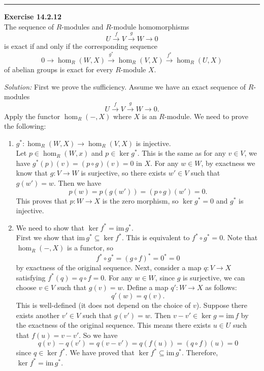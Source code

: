 \documentclass[a4paper, 12pt]{article}
\newenvironment{problem}[2][Exercise]
    { \begin{mdframed}[backgroundcolor=gray!20] \textbf{#1 #2} \\}
    {  \end{mdframed}}
\newenvironment{solution}
    {\textit{Solution:}}
    {}
\newcommand{\im}{\text{im}\,}
\begin{document}
\noindent\rule{7in}{2.8pt}
\newpage 
\begin{problem}{14.2.12}
The sequence of \(R\)-modules and \(R\)-module homomorphisms 
\[U\xrightarrow{f}V\xrightarrow{g}W\rightarrow 0\]
is exact if and only if the corresponding sequence 
\[0\rightarrow \hom_R(W,X)\xrightarrow{g^*}\hom_R(V,X)\xrightarrow{f^*}\hom_R(U,X)\]
of abelian groups is exact for every \(R\)-module \(X\).
\end{problem}
\begin{solution}
First we prove the sufficiency. Assume we have an exact sequence of \(R\)-modules
\[U\xrightarrow{f}V\xrightarrow{g}W\rightarrow 0.\]
Apply the functor \(\hom_R(-,X)\) where \(X\) is an \(R\)-module. We need to prove the following:
\begin{enumerate}[(1)]
\item \(g^*:\hom_R(W,X)\rightarrow \hom_R(V,X)\) is injective.\\ 
Let \(p\in \hom_R(W,x)\) and \(p\in \ker g^*\). This is the same as for any \(v\in V\), we have \(g^*(p)(v)=(p\circ g)(v)=0\) in \(X\). For any \(w\in W\), by exactness we know that 
\(g:V\rightarrow W\) is surjective, so there exists \(w'\in V\) such that \(g(w')=w\). Then we have 
\[p(w)=p(g(w'))=(p\circ g)(w')=0.\]
This proves that \(p:W\rightarrow X\) is the zero morphism, so \(\ker g^*=0\) and \(g^*\) is injective.
\item We need to show that \(\ker f^*=\im g^*\).\\ 
First we show that \(\im g^*\subseteq \ker f^*\). This is equivalent to \(f^*\circ g^*=0\). Note that \(\hom_R(-,X)\) is a functor, so 
\[f^*\circ g^*=(g\circ f)^*=0^*=0\]
by exactness of the original sequence. Next, consider a map \(q:V\rightarrow X\) satisfying \(f^*(q)=q\circ f=0\). For any \(w\in W\), since \(g\) is surjective, we can choose \(v\in V\) such that \(g(v)=w\). Define 
a map \(q':W\rightarrow X\) as follows:
\[q'(w)=q(v).\]
This is well-defined (it does not depend on the choice of \(v\)). Suppose there exists another \(v'\in V\) such that \(g(v')=w\). Then \(v-v'\in \ker g=\im f \) by the exactness of the original sequence. This means 
there exists \(u\in U\) such that \(f(u)=v-v'\). So we have 
\[q(v)-q(v')=q(v-v')=q(f(u))=(q\circ f)(u)=0\]
since \(q\in \ker f^*\). We have proved that \(\ker f^*\subseteq \im g^*\). Therefore, \(\ker f^*=\im g^*\).

\end{enumerate}
\end{solution}
\end{document}
